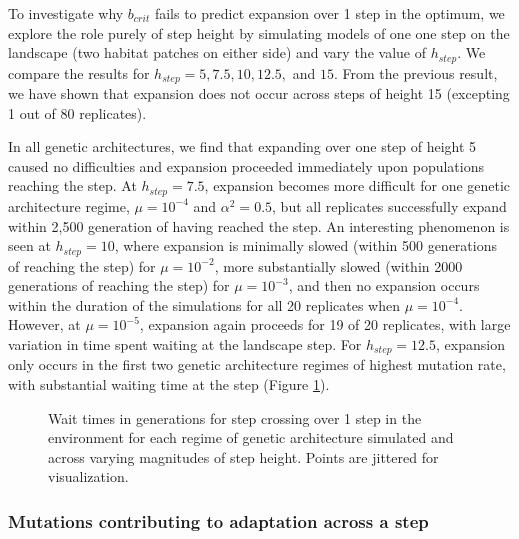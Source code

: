To investigate why $b_{crit}$ fails to predict expansion over 1 step in the optimum, we explore the role purely of step height by simulating models of one one step on the landscape (two habitat patches on either side) and vary the value of $h_{step}$. We compare the results for $h_{step} = 5, 7.5, 10, 12.5,$ and $15$. From the previous result, we have shown that expansion does not occur across steps of height 15 (excepting 1 out of 80 replicates).

In all genetic architectures, we find that expanding over one step of height 5 caused no difficulties and expansion proceeded immediately upon populations reaching the step. At $h_{step} = 7.5$, expansion becomes more difficult for one genetic architecture regime, $\mu = 10^{-4}$ and $\alpha^2 = 0.5$, but all replicates successfully expand within 2,500 generation of having reached the step. An interesting phenomenon is seen at $h_{step} = 10$, where expansion is minimally slowed (within 500 generations of reaching the step) for $\mu = 10^{-2}$, more substantially slowed (within 2000 generations of reaching the step) for $\mu = 10^{-3}$, and then no expansion occurs within the duration of the simulations for all 20 replicates when $\mu = 10^{-4}$. However, at $\mu = 10^{-5}$, expansion again proceeds for 19 of 20 replicates, with large variation in time spent waiting at the landscape step. For $h_{step} = 12.5$, expansion only occurs in the first two genetic architecture regimes of highest mutation rate, with substantial waiting time at the step (Figure \ref{fig:waittimes}).



\begin{figure}[h]
\centering
{}
\caption[Wait times for step crossing.]{Wait times in generations for step crossing over 1 step in the environment for each regime of genetic architecture simulated and across varying magnitudes of step height. Points are jittered for visualization.}
\label{fig:waittimes}
\end{figure}

\subsubsection{Mutations contributing to adaptation across a step}


